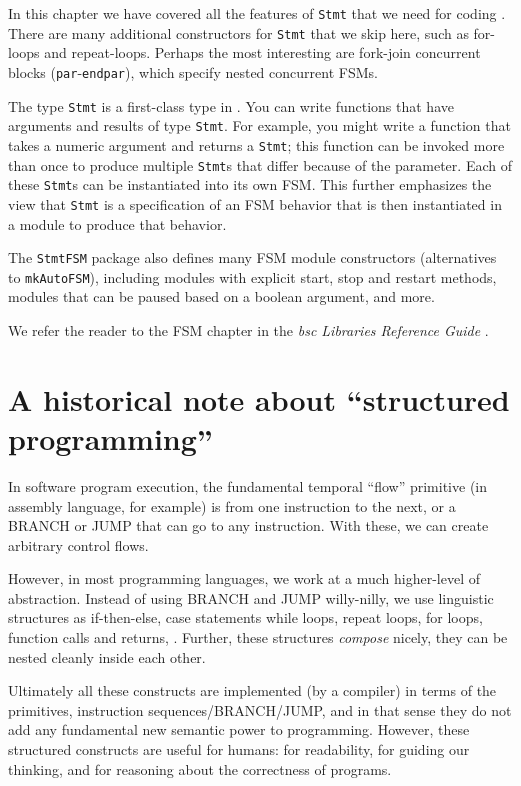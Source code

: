 In this chapter we have covered all the features of \verb|Stmt| that
we need for coding {\DRUM}.  There are many additional constructors for
\verb|Stmt| that we skip here, such as for-loops and repeat-loops.
Perhaps the most interesting are fork-join concurrent blocks
(\verb|par|-\verb|endpar|), which specify nested concurrent FSMs.

The type \verb|Stmt| is a first-class type in {\BSV}.  You can write
functions that have arguments and results of type \verb|Stmt|.  For
example, you might write a function that takes a numeric argument and
returns a \verb|Stmt|; this function can be invoked more than once to
produce multiple \verb|Stmt|s that differ because of the parameter.
Each of these \verb|Stmt|s can be instantiated into its own FSM.  This
further emphasizes the view that \verb|Stmt| is a specification of an
FSM behavior that is then instantiated in a module to produce that
behavior.

The \verb|StmtFSM| package also defines many FSM module constructors
(alternatives to \verb|mkAutoFSM|), including modules with explicit
start, stop and restart methods, modules that can be paused based on a
boolean argument, and more.

We refer the reader to the FSM chapter in the \emph{bsc Libraries
Reference Guide} \cite{bsc_libs_ref_guide}.


\section{A historical note about ``structured programming''}

In software program execution, the fundamental temporal ``flow''
primitive (in assembly language, for example) is from one instruction
to the next, or a BRANCH or JUMP that can go to any instruction.  With
these, we can create arbitrary control flows.

However, in most programming languages, we work at a much higher-level
of abstraction.  Instead of using BRANCH and JUMP willy-nilly, we use
linguistic structures as if-then-else, case statements while loops,
repeat loops, for loops, function calls and returns, {\etc}.  Further,
these structures \emph{compose} nicely, {\ie} they can be nested
cleanly inside each other.

Ultimately all these constructs are implemented (by a compiler) in
terms of the primitives, instruction sequences/BRANCH/JUMP, and in
that sense they do not add any fundamental new semantic power to
programming.  However, these structured constructs are useful for
humans: for readability, for guiding our thinking, and for reasoning
about the correctness of programs.

